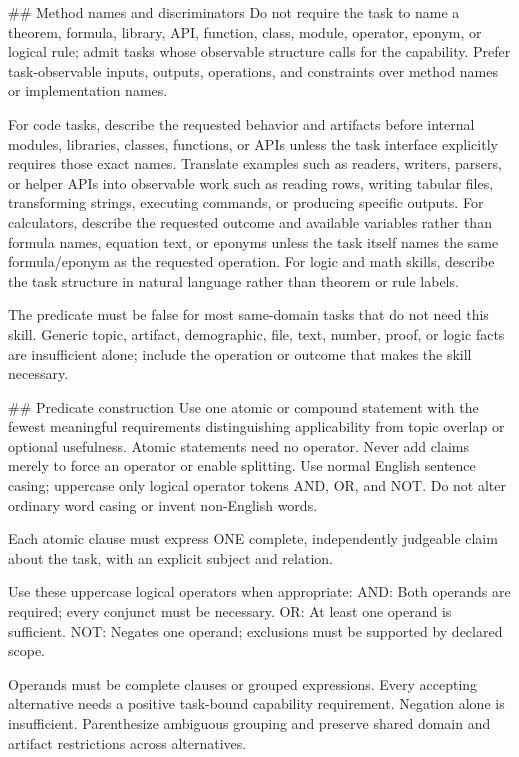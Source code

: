 \par\smallskip
\#\# Method names and discriminators Do not require the task to name a theorem, formula, library, API, function, class, module, operator, eponym, or logical rule; admit tasks whose observable structure calls for the capability. Prefer task-observable inputs, outputs, operations, and constraints over method names or implementation names.
\par\smallskip
For code tasks, describe the requested behavior and artifacts before internal modules, libraries, classes, functions, or APIs unless the task interface explicitly requires those exact names. Translate examples such as readers, writers, parsers, or helper APIs into observable work such as reading rows, writing tabular files, transforming strings, executing commands, or producing specific outputs. For calculators, describe the requested outcome and available variables rather than formula names, equation text, or eponyms unless the task itself names the same formula/eponym as the requested operation. For logic and math skills, describe the task structure in natural language rather than theorem or rule labels.
\par\smallskip
The predicate must be false for most same-domain tasks that do not need this skill. Generic topic, artifact, demographic, file, text, number, proof, or logic facts are insufficient alone; include the operation or outcome that makes the skill necessary.
\par\smallskip
\#\# Predicate construction Use one atomic or compound statement with the fewest meaningful requirements distinguishing applicability from topic overlap or optional usefulness. Atomic statements need no operator. Never add claims merely to force an operator or enable splitting. Use normal English sentence casing; uppercase only logical operator tokens AND, OR, and NOT. Do not alter ordinary word casing or invent non-English words.
\par\smallskip
Each atomic clause must express ONE complete, independently judgeable claim about the task, with an explicit subject and relation.
\par\smallskip
Use these uppercase logical operators when appropriate: AND: Both operands are required; every conjunct must be necessary. OR: At least one operand is sufficient. NOT: Negates one operand; exclusions must be supported by declared scope.
\par\smallskip
Operands must be complete clauses or grouped expressions. Every accepting alternative needs a positive task-bound capability requirement. Negation alone is insufficient. Parenthesize ambiguous grouping and preserve shared domain and artifact restrictions across alternatives.
